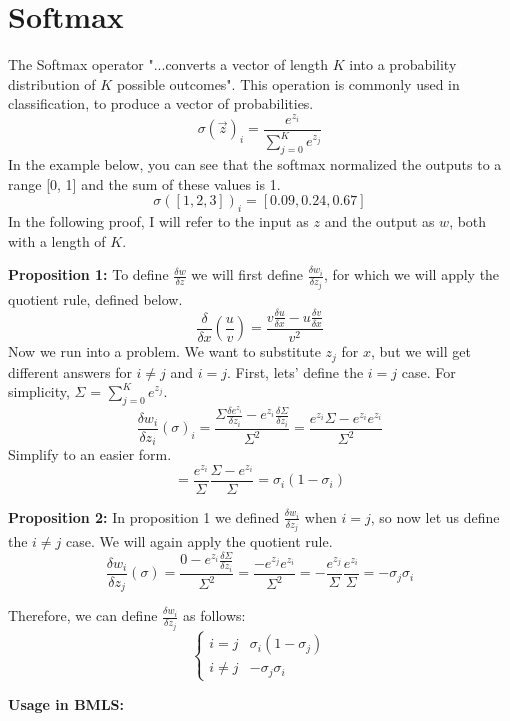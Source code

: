 \documentclass{article}
\begin{document}
\noindent\makebox[\linewidth]{\rule{\paperwidth}{0.4pt}}
    \section{Softmax}
        The Softmax operator "...converts a vector of length $K$ into a probability distribution of $K$ possible outcomes".\cite{wiki:Softmax_function} This operation
        is commonly used in classification, to produce a vector of probabilities. 
        $$\sigma(\overrightarrow{z})_i = \frac{e^{z_i}}{\sum_{j=0}^{K}e^{z_j}}$$
        In the example below, you can see that the softmax normalized the outputs to a range [0, 1] and the sum of these values is 1.  
        $$\sigma([1, 2, 3])_i = [0.09, 0.24, 0.67]$$
        In the following proof, I will refer to the input as $z$ and the output as $w$, both with a length of $K$. 

        \textbf{Proposition 1:}
        To define $\frac{\delta{w}}{\delta{z}}$ we will first define $\frac{\delta{w_i}}{\delta{z_j}}$, for which we will apply the quotient rule, defined below. 
        $$\frac{\delta}{\delta{x}}(\frac{u}{v}) = \frac{v\frac{\delta{u}}{\delta{x}} - u\frac{\delta{v}}{\delta{x}}}{v^2}$$
        Now we run into a problem. We want to substitute $z_j$ for $x$, but we will get different answers for $i\ne j$ and $i=j$. First, lets' define the $i=j$ case. For simplicity, $\Sigma$ = $\sum_{j=0}^{K}e^{z_j}$.
        $$\frac{\delta{w_i}}{\delta{z_i}}(\sigma)_i = \frac{\Sigma \frac{\delta{e^{z_i}}}{\delta{z_i}} 
        - e^{z_i}\frac{\delta{\Sigma}}{\delta{z_i}}}{\Sigma^2} = \frac{e^{z_i}\Sigma - e^{z_i}e^{z_i}}{\Sigma^2}$$
        Simplify to an easier form. 
        $$= \frac{e^{z_i}}{\Sigma} \frac{\Sigma - e^{z_i}}{\Sigma} = \sigma_i(1 - \sigma_i)$$

        \textbf{Proposition 2:}
        In proposition 1 we defined $\frac{\delta{w_i}}{\delta{z_j}}$ when $i=j$, so now let us define the $i\ne j$ case. We will again apply the quotient rule.
        $$\frac{\delta{w_i}}{\delta{z_j}}(\sigma) = \frac{0- e^{z_i}\frac{\delta{\Sigma}}{\delta{z_i}}}{\Sigma^2} = \frac{-e^{z_j}e^{z_i}}{\Sigma^2} = 
        -\frac{e^{z_j}}{\Sigma} \frac{e^{z_i}}{\Sigma} = -\sigma_j \sigma_i$$

        Therefore, we can define $\frac{\delta{w_i}}{\delta{z_j}}$ as follows:
        \[ 
        \begin{cases} 
            i=j & \sigma_i(1 - \sigma_j) \\
            i\ne j & -\sigma_j \sigma_i
        \end{cases}
        \]

        \textbf{Usage in BMLS:}
        

\noindent\makebox[\linewidth]{\rule{\paperwidth}{0.4pt}}
    \printbibliography
\end{document}
